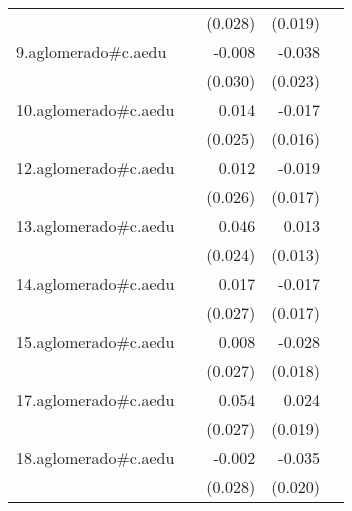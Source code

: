 {\begin{longtable}{l*{4}{D{.}{.}{-1}}}
            &                     &     (0.028)         &     (0.019)         &                     \\
\addlinespace
9.aglomerado#c.aedu&                     &      -0.008         &      -0.038         &                     \\
            &                     &     (0.030)         &     (0.023)         &                     \\
\addlinespace
10.aglomerado#c.aedu&                     &       0.014         &      -0.017         &                     \\
            &                     &     (0.025)         &     (0.016)         &                     \\
\addlinespace
12.aglomerado#c.aedu&                     &       0.012         &      -0.019         &                     \\
            &                     &     (0.026)         &     (0.017)         &                     \\
\addlinespace
13.aglomerado#c.aedu&                     &       0.046         &       0.013         &                     \\
            &                     &     (0.024)         &     (0.013)         &                     \\
\addlinespace
14.aglomerado#c.aedu&                     &       0.017         &      -0.017         &                     \\
            &                     &     (0.027)         &     (0.017)         &                     \\
\addlinespace
15.aglomerado#c.aedu&                     &       0.008         &      -0.028         &                     \\
            &                     &     (0.027)         &     (0.018)         &                     \\
\addlinespace
17.aglomerado#c.aedu&                     &       0.054\sym{*}  &       0.024         &                     \\
            &                     &     (0.027)         &     (0.019)         &                     \\
\addlinespace
18.aglomerado#c.aedu&                     &      -0.002         &      -0.035         &                     \\
            &                     &     (0.028)         &     (0.020)         &                     \\

\end{longtable}}
